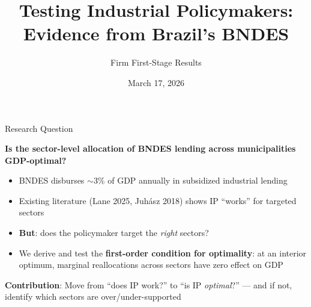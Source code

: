 \documentclass[aspectratio=169,11pt]{beamer}
\title{Testing Industrial Policymakers:\\Evidence from Brazil's BNDES}
\subtitle{Firm First-Stage Results}
\author{}
\date{March 17, 2026}
\begin{document}
\begin{frame}
\titlepage
\end{frame}

\begin{frame}{Research Question}

\textbf{Is the sector-level allocation of BNDES lending across municipalities GDP-optimal?}

\bigskip

\begin{itemize}
    \item BNDES disburses $\sim$3\% of GDP annually in subsidized industrial lending
    \item Existing literature (Lane 2025, Juh\'asz 2018) shows IP ``works'' for targeted sectors
    \item \textbf{But}: does the policymaker target the \emph{right} sectors?
    \item We derive and test the \textbf{first-order condition for optimality}: at an interior optimum, marginal reallocations across sectors have zero effect on GDP
\end{itemize}

\bigskip

\textbf{Contribution}: Move from ``does IP work?'' to ``is IP \emph{optimal}?''
--- and if not, identify which sectors are over/under-supported

\end{frame}
\end{document}
